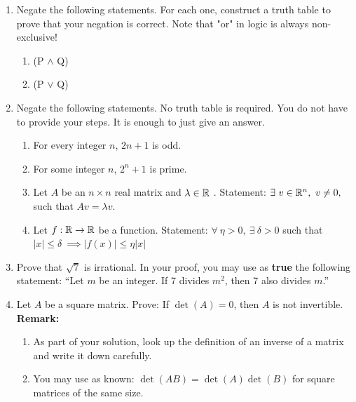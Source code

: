 \documentclass[letterpaper]{article}
\begin{document}
\begin{enumerate}

\item Negate the following statements. For each one, construct a truth table to prove that your negation is correct. Note that "or" in logic is always non-exclusive!

\begin{enumerate}
\setlength{\itemsep}{.1in}
\renewcommand{\labelenumi}{(\alph{enumi})}
\item  (P $\land$ Q)

\item (P $ \lor$ Q)

\end{enumerate}


\item Negate the following statements. No truth table is required. You do not have to provide your steps. It is enough to just give an answer.
\begin{enumerate}
\setlength{\itemsep}{.1in}
\renewcommand{\labelenumi}{(\alph{enumi})}


\item  For every integer $n$, $2n+1$ is odd.

\item For some integer $n$, $2^n + 1$ is prime.

\item Let $A$ be an $n \times n$ real matrix and $ \lambda \in \mathbb R$ . Statement: $\exists~v\in \mathbb R^n, ~ v\not= 0,$ such that $Av = \lambda v$.

\item  Let $f: \mathbb R \to \mathbb R$ be a function. Statement: $\forall~\eta>0,~\exists~\delta>0$ such that $|x| \le \delta~\implies |f(x)| \le \eta |x|$

\end{enumerate}


\item Prove that $\sqrt{7}$ is irrational. In your proof, you may use as \textbf{true} the following statement: ``Let $m$ be an integer. If 7 divides $m^2$, then 7 also divides $m$.''



\item Let $A$ be a square matrix. Prove: If  $\det(A) = 0 $, then $A$ is not invertible.\\

\textbf{Remark:}
\begin{enumerate}
\setlength{\itemsep}{.1in}
\renewcommand{\labelenumi}{(\alph{enumi})}
\item As part of your solution, look up the definition of an inverse of  a matrix and write it down carefully.
\item You may use as known: $\det(AB) = \det(A) \det(B)$ for square matrices of the same size.
\end{enumerate}


\end{enumerate}
\end{document}
